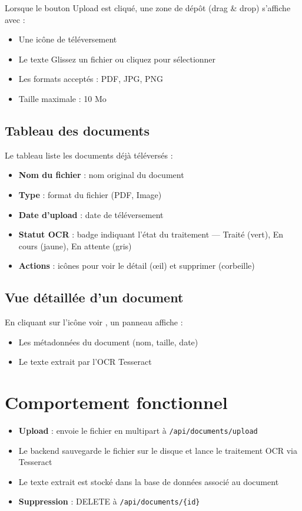 \documentclass[12pt,a4paper]{report}
\begin{document}
Lorsque le bouton Upload est cliqué, une zone de dépôt (drag \& drop) s'affiche avec :
\begin{itemize}
    \item Une icône de téléversement
    \item Le texte \og Glissez un fichier ou cliquez pour sélectionner \fg{}
    \item Les formats acceptés : PDF, JPG, PNG
    \item Taille maximale : 10 Mo
\end{itemize}

\subsection{Tableau des documents}

Le tableau liste les documents déjà téléversés :
\begin{itemize}
    \item \textbf{Nom du fichier} : nom original du document
    \item \textbf{Type} : format du fichier (PDF, Image)
    \item \textbf{Date d'upload} : date de téléversement
    \item \textbf{Statut OCR} : badge indiquant l'état du traitement — \og Traité \fg{} (vert), \og En cours \fg{} (jaune), \og En attente \fg{} (gris)
    \item \textbf{Actions} : icônes pour voir le détail (œil) et supprimer (corbeille)
\end{itemize}

\subsection{Vue détaillée d'un document}

En cliquant sur l'icône \og voir \fg{}, un panneau affiche :
\begin{itemize}
    \item Les métadonnées du document (nom, taille, date)
    \item Le texte extrait par l'OCR Tesseract
\end{itemize}

\section{Comportement fonctionnel}

\begin{itemize}
    \item \textbf{Upload} : envoie le fichier en multipart à \texttt{/api/documents/upload}
    \item Le backend sauvegarde le fichier sur le disque et lance le traitement OCR via Tesseract
    \item Le texte extrait est stocké dans la base de données associé au document
    \item \textbf{Suppression} : DELETE à \texttt{/api/documents/\{id\}}
\end{itemize}
\end{document}
